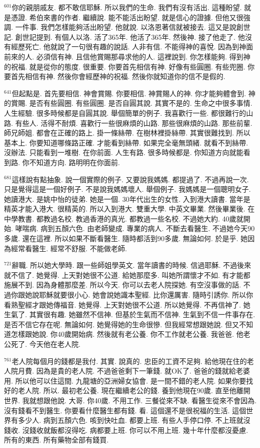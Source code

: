 \documentclass{book}
\begin{document}
$^{601}$你的親朋戚友.
都不敢信耶穌.
所以我們的生命.
我們有沒有活出.
這種盼望.
就是憑證.
希伯來書的作者.
繼續說.
能不能活出盼望.
就是信心的證據.
但他又很強調.
一件事.
我們怎樣能夠活出盼望.
他就說.
以洛恩著信就被接去.
這又是說創世記.
創世記提到.
有個人以洛.
活了365年.
他活了365年.
然後神.
接了他走了.
他沒有經歷死亡.
他就說了一句很有趣的說話.
人非有信.
不能得神的喜悅.
因為到神面前來的人.
必須信有神.
且信他賞賜那尋求他的人.
這裡說到.
你怎樣能夠.
得到神的祝福.
就是從你的態度.
很重要.
你要首先相信有神.
好像有些圓圈.
有些兜圈.
你要首先相信有神.
然後你會經歷神的祝福.
然後你就知道你的信不是假的.

$^{641}$但起點是.
首先要相信.
神會賞賜.
你要相信.
神賞賜人的神.
你才能夠體會到.
神的賞賜.
是否有些圓圈.
有些圓圈.
是否自圓其說.
其實不是的.
生命之中很多事情.
人生經驗.
很多時候都是自圓其說.
舉個簡單的例子.
我喜歡行一些.
都很難行的山路.
有些人.
活得不耐煩.
喜歡行一些很麻煩的山路.
那些很麻煩的山路.
那些前輩.
師兄師姐.
都會在正確的路上.
掛一條絲帶.
在樹林裡掛絲帶.
其實很難找到.
所以基本上.
你要知道哪條路正確.
才能看到絲帶.
如果完全毫無頭緒.
就看不到絲帶.
沒辦法.
只能看到一堆樹.
在你前面.
人生有路.
很多時候都是.
你知道方向就能看到路.
你不知道方向.
路明明在你面前.

$^{681}$這樣說有點抽象.
說一個實際的例子.
又要說我媽媽.
都提過了.
不過再說一次.
只是覺得這是一個好例子.
不是說我媽媽壞人.
舉個例子.
我媽媽是一個聰明女子.
她讀港大.
是姚中怡的徒弟.
她是一個.
30年代出生的女性.
入到港大讀書.
當年是精英才能入港大.
很精英的.
所以入到港大.
雙重大學.
中英文畢業.
然後畢業後.
在中學教書.
都教過名校.
教過香港的真光.
都教過一些名校.
不過她大約.
40歲就開始.
哮喘病.
病到五顏六色.
由老師變成.
專業的病人.
不斷去看醫生.
不過她今天90多歲.
還在這裡.
所以如果不斷看醫生.
隨時都活到90多歲.
無論如何.
於是乎.
她因為經常看醫生.
經常不舒服.
不能做老師.

$^{721}$辭職.
所以她大學時.
跟一些師姐學英文.
當年讀書的時候.
信過耶穌.
不過後來就不信了.
她覺得.
上天對她很不公道.
給她那麼多.
叫她所謂懷才不如.
有才能都施展不到.
因為身體那麼差.
所以今天.
你可以去老人院探她.
有空沒事做的話.
不過你跟她說耶穌就要很小心.
她會說她識本聖經.
比你還厲害.
隨時引誘你.
所以你看熟聖經才跟她傳福音.
她覺得.
上天對她很不公道.
所以她覺得.
不再信神了.
她生氣了.
其實很有趣.
她雖然不信神.
但基於生氣而不信神.
生氣到不信一件事存在.
是否不信它存在呢.
無論如何.
她覺得她的生命很慘.
但我經常想跟她說.
但又不知道怎樣跟她說.
你40歲開始病.
然後就有老公養.
你不工作就老公養.
我爸爸.
他老公死了.
今天他在老人院.

$^{761}$老人院每個月的錢都是我付.
其實.
說真的.
忠臣的工資不足夠.
給他現在住的老人院月費.
因為是貴的老人院.
不過爸爸剩下一筆錢.
就OK了.
爸爸的錢就給老婆用.
所以他可以住這間.
九龍塘的亞洲婦女協會.
是一間不錯的老人院.
如果你要找好的老人院.
所以.
最初老公養.
現在繼續老公的錢.
養到他現在90歲.
直至他離開世界.
我就想跟他說.
大哥.
你40歲.
不用工作.
三餐從來不缺.
看醫生從來不會因為.
沒有錢看不到醫生.
你要看什麼醫生都有錢.
看.
這個還不是很祝福的生活.
這個世界有多少人.
病到五顏六色.
咳到快吐血.
都要上班.
有些人手停口停.
不上班就沒錢收.
沒錢收就飯都沒得吃.
病都要上班.
你可以不用上班.
幾十年什麼都沒憂慮.
所有的東西.
所有藥物全部有錢買.
\end{document}
